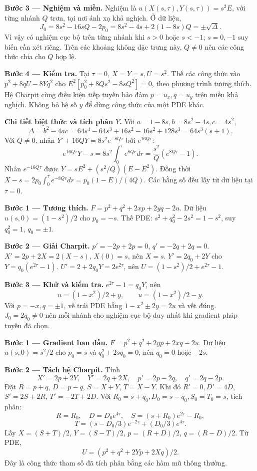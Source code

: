 \textbf{Bước 3 — Nghiệm và miền.} Nghiệm là $u(X(s,\tau),Y(s,\tau))=s^2E$, với từng nhánh $Q$ trơn, tại nơi ánh xạ khả nghịch. Ở dữ liệu,
\[J_0=8s^2-16sQ-2p_0=8s^2-4s+2(1-8s)Q=\pm\sqrt\Delta.\]
Vì vậy có nghiệm cục bộ trên từng nhánh khi $s>0$ hoặc $s<-1$; $s=0,-1$ suy biến cần xét riêng. Trên các khoảng không đặc trưng này, $Q\ne0$ nên các công thức chia cho $Q$ hợp lệ.

\textbf{Bước 4 — Kiểm tra.} Tại $\tau=0$, $X=Y=s,U=s^2$. Thế các công thức vào $p^2+8qU-8Yq^2$ cho $E^2[p_0^2+8Qs^2-8sQ^2]=0$, theo phương trình tương thích. Hệ Charpit cùng điều kiện tiếp tuyến bảo đảm $p=u_x,q=u_y$ trên miền khả nghịch. Không bỏ hệ số $y$ để dùng công thức của một PDE khác.

\textbf{Chi tiết biệt thức và tích phân $Y$.} Với $a=1-8s,b=8s^2-4s,c=4s^2$,
\[\Delta=b^2-4ac=64s^4-64s^3+16s^2-16s^2+128s^3=64s^3(s+1).\]
Với $Q\ne0$, nhân $Y'+16QY=8s^2e^{-8Q\tau}$ bởi $e^{16Q\tau}$:
\[e^{16Q\tau}Y-s=8s^2\int_0^\tau e^{8Qr}dr=\frac{s^2}{Q}(e^{8Q\tau}-1).\]
Nhân $e^{-16Q\tau}$ được $Y=sE^2+(s^2/Q)(E-E^2)$. Đồng thời $X-s=2p_0\int_0^\tau e^{-8Qr}dr=p_0(1-E)/(4Q)$. Các hằng số đều lấy từ dữ liệu tại $\tau=0$.

\textbf{Bước 1 — Tương thích.} $F=p^2+q^2+2xp+2yq-2u$. Dữ liệu $u(s,0)=(1-s^2)/2$ cho $p_0=-s$. Thế PDE: $s^2+q_0^2-2s^2=1-s^2$, suy $q_0^2=1$, $q_0=\pm1$.

\textbf{Bước 2 — Giải Charpit.} $p'=-2p+2p=0$, $q'=-2q+2q=0$. $X'=2p+2X=2(X-s)$, $X(0)=s$, nên $X=s$. $Y'=2q_0+2Y$ cho $Y=q_0(e^{2\tau}-1)$. $U'=2+2q_0Y=2e^{2\tau}$, nên $U=(1-s^2)/2+e^{2\tau}-1$.

\textbf{Bước 3 — Khử và kiểm tra.} $e^{2\tau}-1=q_0Y$, nên
\[u=(1-x^2)/2+y,\qquad u=(1-x^2)/2-y.\]
Với $p=-x,q=\pm1$, vế trái PDE bằng $1-x^2\pm2y=2u$ và vết đúng. $J_0=2q_0\ne0$ nên mỗi nhánh cho nghiệm cục bộ duy nhất khi gradient pháp tuyến đã chọn.

\textbf{Bước 1 — Gradient ban đầu.} $F=p^2+q^2+2yp+2xq-2u$. Dữ liệu $u(s,0)=s^2/2$ cho $p_0=s$ và $q_0^2+2sq_0=0$, nên $q_0=0$ hoặc $-2s$.

\textbf{Bước 2 — Tách hệ Charpit.} Tính
\[X'=2p+2Y,\quad Y'=2q+2X,\quad p'=2p-2q,\quad q'=2q-2p.\]
Đặt $R=p+q$, $D=p-q$, $S=X+Y$, $T=X-Y$. Khi đó $R'=0,D'=4D$, $S'=2S+2R$, $T'=-2T+2D$. Với $R_0=s+q_0,D_0=s-q_0,S_0=T_0=s$, tích phân:
\[R=R_0,\quad D=D_0e^{4\tau},\quad S=(s+R_0)e^{2\tau}-R_0,\]
\[T=(s-D_0/3)e^{-2\tau}+(D_0/3)e^{4\tau}.\]
Lấy $X=(S+T)/2$, $Y=(S-T)/2$, $p=(R+D)/2$, $q=(R-D)/2$. Từ PDE,
\[U=(p^2+q^2+2Yp+2Xq)/2.\]
Đây là công thức tham số đã tích phân bằng các hàm mũ thông thường.

